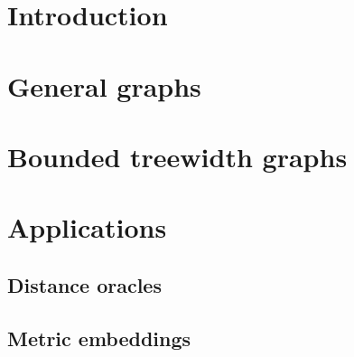 
    \section{Introduction}
    \section{General graphs}
    \section{Bounded treewidth graphs}
    \section{Applications}
    \subsection{Distance oracles}
    \subsection{Metric embeddings}

